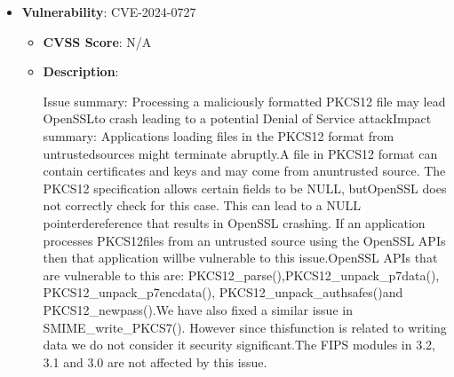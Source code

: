 \documentclass{article}
\begin{document}
\begin{itemize}
        \item \textbf{Vulnerability}: CVE-2024-0727
        \begin{itemize}
            \item \textbf{CVSS Score}:  N/A 
            \item \textbf{Description}:
            \parbox[t]{0.9\linewidth}{
                \ttfamily Issue summary: Processing a maliciously formatted PKCS12 file may lead OpenSSLto crash leading to a potential Denial of Service attackImpact summary: Applications loading files in the PKCS12 format from untrustedsources might terminate abruptly.A file in PKCS12 format can contain certificates and keys and may come from anuntrusted source. The PKCS12 specification allows certain fields to be NULL, butOpenSSL does not correctly check for this case. This can lead to a NULL pointerdereference that results in OpenSSL crashing. If an application processes PKCS12files from an untrusted source using the OpenSSL APIs then that application willbe vulnerable to this issue.OpenSSL APIs that are vulnerable to this are: PKCS12\_parse(),PKCS12\_unpack\_p7data(), PKCS12\_unpack\_p7encdata(), PKCS12\_unpack\_authsafes()and PKCS12\_newpass().We have also fixed a similar issue in SMIME\_write\_PKCS7(). However since thisfunction is related to writing data we do not consider it security significant.The FIPS modules in 3.2, 3.1 and 3.0 are not affected by this issue.
            }
        \end{itemize}
    

\end{itemize}
\end{document}
